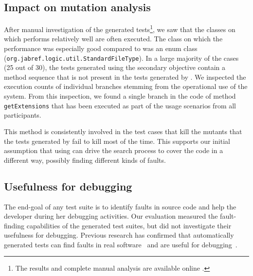 \subsection{Impact on mutation analysis}

After manual investigation of the generated tests\footnote{The results and complete manual analysis are available online \cite{Evers2020, evers_bjorn_2020_3897513, evers_bjorn_2020_3894711}.}, we saw that the classes on which \com performs relatively well are often executed. The class on which the performance was especially good compared to \df was an enum class (\texttt{org.jab\-ref.lo\-gic.util.Stan\-dard\-File\-Type}).
%
In a large majority of the cases (25 out of 30), the tests generated using the \com secondary objective contain a method sequence that is not present in the tests generated by \df.
We inspected the execution counts of individual branches stemming from the operational use of the system. From this inspection, we found a single branch in the code of method \texttt{getExtensions} that has been executed as part of the usage scenarios from all participants. 

This method is consistently involved in the test cases that kill the mutants that the tests generated by \df fail to kill most of the time. 
This supports our initial assumption that using \com can drive the search process to cover the code in a different way, possibly finding different kinds of faults.

\subsection{Usefulness for debugging}

The end-goal of any test suite is to identify faults in source code and help the developer during her debugging activities. Our evaluation measured the fault-finding capabilities of the generated test suites, but did not investigate their usefulness for debugging. Previous research has confirmed that automatically generated tests can find faults in real software~\cite{almasi2017industrial} and are useful for debugging~\cite{Ceccato2015}. 

